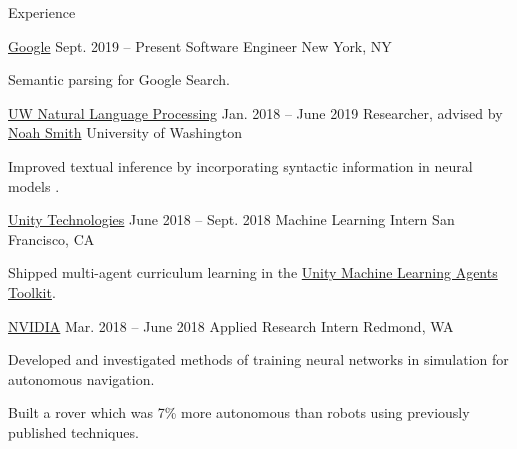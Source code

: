 \documentclass{resume}
\begin{document}
\begin{rSection}{Experience}
  \begin{rSubsection}{\href{https://careers.google.com/locations/mountain-view/}
                           {Google}}
                     {Sept. 2019 -- Present}
                     {Software Engineer}
                     {New York, NY}
    \item Semantic parsing for Google Search.
  \end{rSubsection}

  \begin{rSubsection}{\href{https://nlp.washington.edu/}
                           {UW Natural Language Processing}}
                     {Jan. 2018 -- June 2019}
                     {Researcher, advised by
                       \href{https://homes.cs.washington.edu/~nasmith/}
                            {Noah Smith}}
                     {University of Washington}
    \item Improved textual inference by incorporating syntactic
      information in neural models \citep{pang2019improving}.
  \end{rSubsection}

  \begin{rSubsection}{{\href{https://unity3d.ai/}{Unity Technologies}}}
                      {June 2018 -- Sept. 2018}
                      {Machine Learning Intern}
                      {San Francisco, CA}
    \item Shipped multi-agent curriculum learning in the
      \href{https://github.com/Unity-Technologies/ml-agents}
           {Unity Machine Learning Agents Toolkit}.
  \end{rSubsection}

  \begin{rSubsection}{{\href{http://www.nvidia.com/page/home.html}{NVIDIA}}}
                      {Mar. 2018 -- June 2018}
                      {Applied Research Intern}
                      {Redmond, WA}
    \item Developed and investigated methods of training neural networks in
      simulation for autonomous navigation.
    \item Built a rover which was 7\% more autonomous than robots using
      previously published techniques.
  \end{rSubsection}


\end{rSection}
\end{document}
